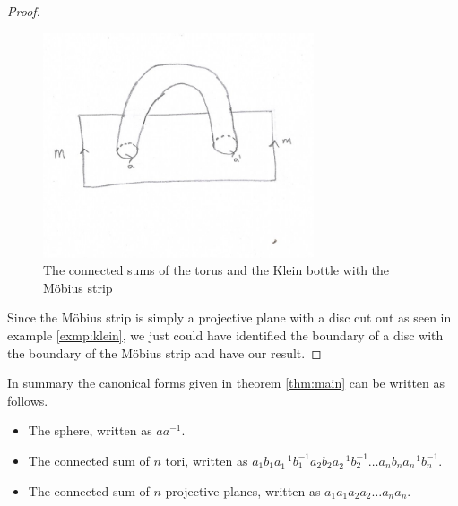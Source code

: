 \begin{proof}
  \begin{figure}[htbp]
    \centering
    \includegraphics[width=8cm]{gluemob.png}
    \caption{The connected sums of the torus and the Klein bottle with
      the M\"obius strip}
    \label{fig:glue-mob}
  \end{figure}
  Since the M\"obius strip is simply a projective plane with a disc cut
  out as seen in example \ref{exmp:klein}, we just could have
  identified the boundary of a disc with the boundary of the M\"obius
  strip and have our result.
\end{proof}

In summary the canonical forms given in theorem \ref{thm:main} can be
written as follows. 

\begin{itemize}
\item The sphere, written as $aa^{-1}$.
\item The connected sum of $n$ tori,  written as
  $a_1b_1a_1^{-1}b_1^{-1}a_2b_2a_2^{-1}b_2^{-1} \dots
  a_nb_na_n^{-1}b_n^{-1}$.
\item The connected sum of $n$ projective planes, written as
  $a_1a_1a_2a_2 \dots a_na_n$.
\end{itemize}

